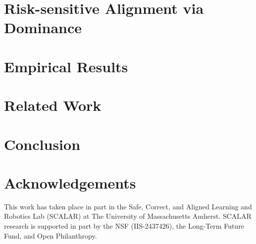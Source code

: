 \documentclass[10pt]{article} %
\begin{document}
\section{Risk-sensitive Alignment via Dominance}
\label{sec: method}


\section{Empirical Results}
\label{sec: results}


\section{Related Work}
\label{sec: relatedwork}


\section{Conclusion}
\label{sec: conclusion}


\section*{Acknowledgements}

This work has taken place in part in the Safe, Correct, and Aligned Learning and Robotics Lab (SCALAR) at The University of Massachusetts Amherst. SCALAR research is supported in part by the NSF (IIS-2437426), the Long-Term Future Fund, and Open Philanthropy.


\end{document}
